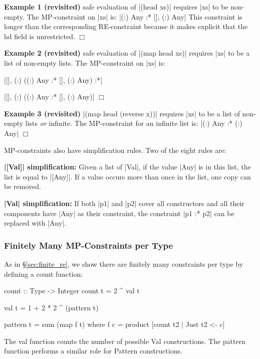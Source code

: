 \documentclass[preprint]{sigplanconf}
\newcommand{\C}[1]{\textsf{#1}}
\newcommand{\noexample}{\hfill$\Box$\par\addvspace{2mm}}
\newcommand{\para}[1]{\vspace{2mm}\noindent\textbf{#1}}
\newenvironment{revisit}[1]
    {\addvspace{2mm}\noindent\textbf{Example #1 (revisited)}}
    {\noexample}
\begin{document}
\begin{revisit}{1} safe evaluation of |(head xs)| requires |xs| to be non-empty. The MP-constraint on |xs| is: |{(:) Any} :* {[], (:) Any}| This constraint is longer than the corresponding RE-constraint because it makes explicit that the \C{hd} field is unrestricted.
\end{revisit}

\begin{revisit}{2} safe evaluation of |(map head xs)| requires |xs| to be a list of non-empty lists. The MP-constraint on |xs| is:

\smallskip
\par\noindent |{[], (:) ({(:) Any} :* {[], (:) Any})} :*|
\par\noindent |{[], (:) ({(:) Any} :* {[], (:) Any})}|
\end{revisit}

\begin{revisit}{3} |(map head (reverse x))| requires |xs| to be a list of non-empty lists \textit{or} infinite. The MP-constraint for an infinite list is: |{(:) Any} :* {(:) Any}|
\end{revisit}

MP-constraints also have simplification rules.  Two of the eight rules are:

\para{|[Val]| simplification:} Given a list of |Val|, if the value |Any| is in this list, the list is equal to |[Any]|. If a value occurs more than once in the list, one copy can be removed.

\para{|Val| simplification:} If both |p1| and |p2| cover all constructors and all their components have |Any| as their constraint, the constraint |p1 :* p2| can be replaced with |Any|.


\subsubsection{Finitely Many MP-Constraints per Type}

As in \S\ref{sec:finite_re}, we show there are finitely many constraints per type by defining a \C{count} function:

\begin{code}
count :: Type -> Integer
count t = 2 ^ val t

val t = 1 + 2 * 2 ^ (pattern t)

pattern t = sum (map f t)
    where f c = product [count t2 | Just t2 <- c]
\end{code}

The \C{val} function counts the number of possible \C{Val} constructions. The \C{pattern} function performs a similar role for \C{Pattern} constructions.
\end{document}
